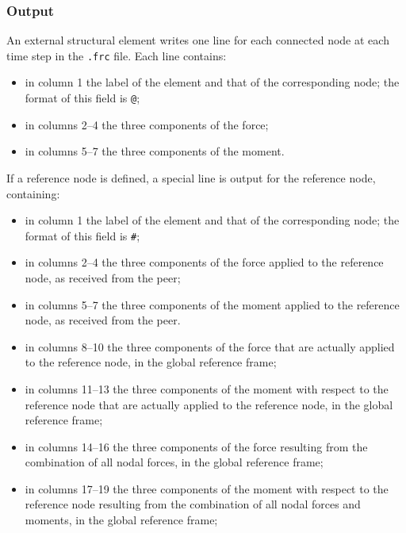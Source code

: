 \subsubsection{Output}
An external structural element writes one line for each connected node
at each time step in the \texttt{.frc} file.
Each line contains:
\begin{itemize}
\item in column 1 the label of the element and that of the corresponding node;
	the format of this field is \texttt{@};
\item in columns 2--4 the three components of the force;
\item in columns 5--7 the three components of the moment.
\end{itemize}
If a reference node is defined, a special line is output for the reference node,
containing:
\begin{itemize}
\item in column 1 the label of the element and that of the corresponding node;
	the format of this field is \texttt{\#};
\item in columns 2--4 the three components of the force applied to the reference node,
	as received from the peer;
\item in columns 5--7 the three components of the moment applied to the reference node,
	as received from the peer.
\item in columns 8--10 the three components of the force that are actually applied to the reference node,
	in the global reference frame;
\item in columns 11--13 the three components of the moment
	with respect to the reference node that are actually applied to the reference node,
	in the global reference frame;
\item in columns 14--16 the three components of the force resulting from the combination
	of all nodal forces, in the global reference frame;
\item in columns 17--19 the three components of the moment
	with respect to the reference node resulting from the combination
	of all nodal forces and moments, in the global reference frame;
\end{itemize}




